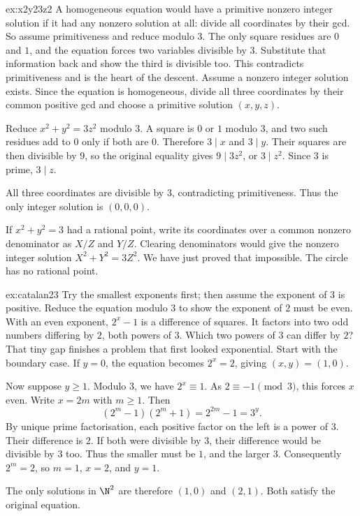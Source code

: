 \begin{solution}{ex:x2y23z2}
\idea A homogeneous equation would have a primitive nonzero integer solution if it had any nonzero solution at all: divide all coordinates by their gcd. So assume primitiveness and reduce modulo $3$. The only square residues are $0$ and $1$, and the equation forces two variables divisible by $3$. Substitute that information back and show the third is divisible too. This contradicts primitiveness and is the heart of the descent.
\writeup Assume a nonzero integer solution exists. Since the equation is homogeneous, divide all three coordinates by their common positive gcd and choose a primitive solution $(x,y,z)$.

Reduce $x^2+y^2=3z^2$ modulo $3$. A square is $0$ or $1$ modulo $3$, and two such residues add to $0$ only if both are $0$. Therefore $3\mid x$ and $3\mid y$. Their squares are then divisible by $9$, so the original equality gives $9\mid3z^2$, or $3\mid z^2$. Since $3$ is prime, $3\mid z$.

All three coordinates are divisible by $3$, contradicting primitiveness. Thus the only integer solution is $(0,0,0)$.

If $x^2+y^2=3$ had a rational point, write its coordinates over a common nonzero denominator as $X/Z$ and $Y/Z$. Clearing denominators would give the nonzero integer solution $X^2+Y^2=3Z^2$. We have just proved that impossible. The circle has no rational point.
\end{solution}

\begin{solution}{ex:catalan23}
\idea Try the smallest exponents first; then assume the exponent of $3$ is positive. Reduce the equation modulo $3$ to show the exponent of $2$ must be even. With an even exponent, $2^x-1$ is a difference of squares. It factors into two odd numbers differing by $2$, both powers of $3$. Which two powers of $3$ can differ by $2$? That tiny gap finishes a problem that first looked exponential.
\writeup Start with the boundary case. If $y=0$, the equation becomes $2^x=2$, giving $(x,y)=(1,0)$.

Now suppose $y\ge1$. Modulo $3$, we have $2^x\equiv1$. As $2\equiv-1\pmod3$, this forces $x$ even. Write $x=2m$ with $m\ge1$. Then
\[
(2^m-1)(2^m+1)=2^{2m}-1=3^y.
\]
By unique prime factorisation, each positive factor on the left is a power of $3$. Their difference is $2$. If both were divisible by $3$, their difference would be divisible by $3$ too. Thus the smaller must be $1$, and the larger $3$. Consequently $2^m=2$, so $m=1$, $x=2$, and $y=1$.

The only solutions in $\N^2$ are therefore $(1,0)$ and $(2,1)$. Both satisfy the original equation.
\end{solution}

